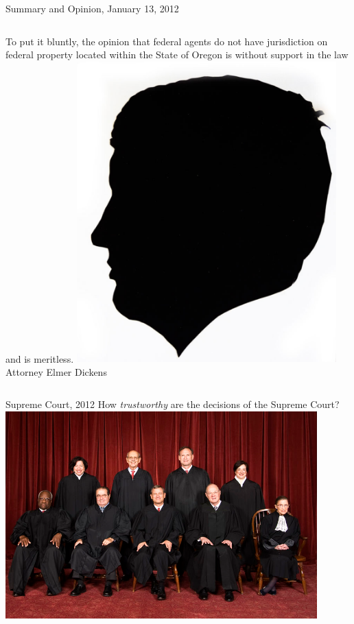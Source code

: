 \begin{frame}{Summary and Opinion, January 13, 2012}
    \begin{columns}[onlytextwidth]
To put it bluntly, the opinion that federal agents do not have jurisdiction on federal property located within the State of Oregon is without support in the law and is meritless.
            \centering
            \includegraphics[width=0.75\textwidth]{img/elmer-dickens.png}
            \\ Attorney Elmer Dickens \\
    \end{columns}
\end{frame}

\begin{frame}{Supreme Court, 2012}
    \centering
    {\LARGE How \emph{trustworthy} are the decisions of the Supreme Court? } \\
    \includegraphics[width=0.9\textwidth]{img/supreme.png} \\
\end{frame}

